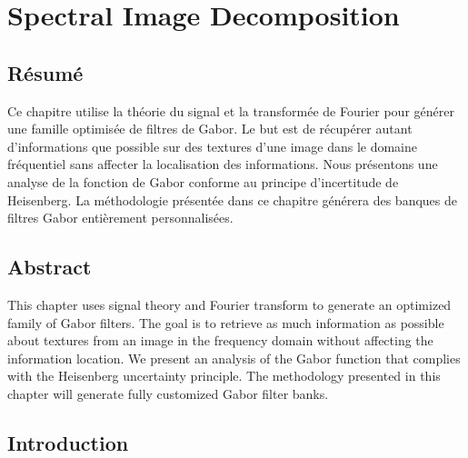%

\chapter{Spectral Image Decomposition}\label{ch:spectral_image_decomposition}

\section*{Résumé}
\noindent Ce chapitre utilise la théorie du signal et la transformée de Fourier pour générer une famille optimisée de filtres de Gabor. Le but est de récupérer autant d'informations que possible sur des textures d'une image dans le domaine fréquentiel sans affecter la localisation des informations. Nous présentons une analyse de la fonction de Gabor conforme au principe d'incertitude de Heisenberg. La méthodologie présentée dans ce chapitre générera des banques de filtres Gabor entièrement personnalisées.

\section*{Abstract}
\noindent This chapter uses signal theory and Fourier transform to generate an optimized family of Gabor filters. The goal is to retrieve as much information as possible about textures from an image in the frequency domain without affecting the information location. We present an analysis of the Gabor function that complies with the Heisenberg uncertainty principle. The methodology presented in this chapter will generate fully customized Gabor filter banks. 

\section{Introduction}

